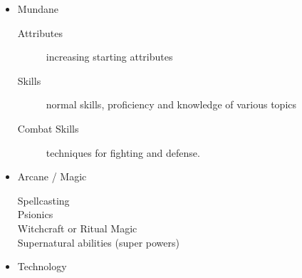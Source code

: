 \documentclass[twoside]{book}
\begin{document}
\begin{itemize}
      
  \item   
                
    {  
     Mundane 
                  
\begin{description}
    
  \item[ Attributes ] 
    {  
      increasing starting attributes 
    }
  
  \item[ Skills ] 
    {  
      normal skills, proficiency and knowledge
                         of various topics 
    }
  
  \item[ Combat Skills ] 
    {  
      techniques for fighting and defense.
                         
    }
  
\end{description}
    
                
    }
    
              
  \item   
                
    {  
     Arcane / Magic 
                  
\begin{description}
    
  \item[ Spellcasting ] 
    {  
    
    }
  
  \item[ Psionics ] 
    {  
    
    }
  
  \item[ Witchcraft or Ritual Magic
                       ] 
    {  
    
    }
  
  \item[ Supernatural abilities (super powers)
                       ] 
    {  
    
    }
  
\end{description}
  
                
    }
    
              
  \item   
                
    {  
     Technology 
                  
}
\end{itemize}
\end{document}
